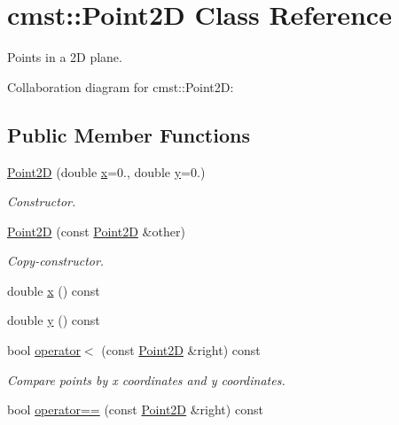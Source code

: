 \hypertarget{classcmst_1_1_point2_d}{}\section{cmst\+:\+:Point2D Class Reference}
\label{classcmst_1_1_point2_d}


Points in a 2D plane.  




Collaboration diagram for cmst\+:\+:Point2D\+:
\subsection*{Public Member Functions}
\begin{DoxyCompactItemize}
\item 
\hyperlink{classcmst_1_1_point2_d_a2291fb012502a29399852810b5a081a8}{Point2D} (double \hyperlink{classcmst_1_1_point2_d_a7745045ba529c4f2a2a0384974a42448}{x}=0., double \hyperlink{classcmst_1_1_point2_d_a15a4383f1c181b7c7518ccac6f578564}{y}=0.)
\begin{DoxyCompactList}\small\item\em Constructor. \end{DoxyCompactList}\item 
\hyperlink{classcmst_1_1_point2_d_a24e903416a709a44f844b93c7295ed67}{Point2D} (const \hyperlink{classcmst_1_1_point2_d}{Point2D} \&other)
\begin{DoxyCompactList}\small\item\em Copy-\/constructor. \end{DoxyCompactList}\item 
double \hyperlink{classcmst_1_1_point2_d_a7745045ba529c4f2a2a0384974a42448}{x} () const 
\item 
double \hyperlink{classcmst_1_1_point2_d_a15a4383f1c181b7c7518ccac6f578564}{y} () const 
\item 
bool \hyperlink{classcmst_1_1_point2_d_ada9efa4e0f4d7906e2ccaf2afeefea38}{operator$<$} (const \hyperlink{classcmst_1_1_point2_d}{Point2D} \&right) const 
\begin{DoxyCompactList}\small\item\em Compare points by x coordinates and y coordinates. \end{DoxyCompactList}\item 
bool \hyperlink{classcmst_1_1_point2_d_a2181e34aa07d5ce5ac48545408924d22}{operator==} (const \hyperlink{classcmst_1_1_point2_d}{Point2D} \&right) const 
\end{DoxyCompactItemize}
